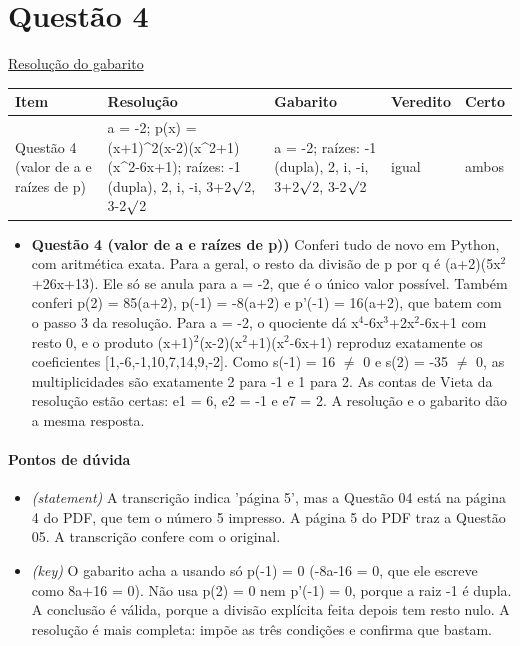 \documentclass{article}%
\begin{document}
\section*{Questão 4}%
\href{https://poliedroresolve.sistemapoliedro.com.br/vestibulares/ita/2027/ita-2-fase-dia-1-20-10-2026-2-fase-dia-1/dissertativa-4-matematica-2-fase-dia-1-ita-2027}{Resolução do gabarito}\par\smallskip%
\begin{longtable}{@{}p{} p{} p{} p{} p{}@{}}\toprule Item & Resolução & Gabarito & Veredito & Certo \\ \midrule
Questão 4 (valor de a e raízes de p) & a = -2; p(x) = (x+1)\^{}2(x-2)(x\^{}2+1)(x\^{}2-6x+1); raízes: -1 (dupla), 2, i, -i, 3+2$\surd$2, 3-2$\surd$2 & a = -2; raízes: -1 (dupla), 2, i, -i, 3+2$\surd$2, 3-2$\surd$2 & igual & ambos \\
\bottomrule\end{longtable}%
\begin{itemize}%
\item%
\textbf{Questão 4 (valor de a e raízes de p))} Conferi tudo de novo em Python, com aritmética exata. Para a geral, o resto da divisão de p por q é (a+2)(5x$^2$+26x+13). Ele só se anula para a = -2, que é o único valor possível. Também conferi p(2) = 85(a+2), p(-1) = -8(a+2) e p'(-1) = 16(a+2), que batem com o passo 3 da resolução. Para a = -2, o quociente dá x$^{4}$-6x$^3$+2x$^2$-6x+1 com resto 0, e o produto (x+1)$^2$(x-2)(x$^2$+1)(x$^2$-6x+1) reproduz exatamente os coeficientes {[}1,-6,-1,10,7,14,9,-2{]}. Como s(-1) = 16 $\neq$ 0 e s(2) = -35 $\neq$ 0, as multiplicidades são exatamente 2 para -1 e 1 para 2. As contas de Vieta da resolução estão certas: e1 = 6, e2 = -1 e e7 = 2. A resolução e o gabarito dão a mesma resposta.%
\end{itemize}%
\paragraph{Pontos de dúvida}%
\begin{itemize}%
\item%
\textit{(statement)} A transcrição indica 'página 5', mas a Questão 04 está na página 4 do PDF, que tem o número 5 impresso. A página 5 do PDF traz a Questão 05. A transcrição confere com o original.%
\item%
\textit{(key)} O gabarito acha a usando só p(-1) = 0 (-8a-16 = 0, que ele escreve como 8a+16 = 0). Não usa p(2) = 0 nem p'(-1) = 0, porque a raiz -1 é dupla. A conclusão é válida, porque a divisão explícita feita depois tem resto nulo. A resolução é mais completa: impõe as três condições e confirma que bastam.%
\end{itemize}%
\end{document}

